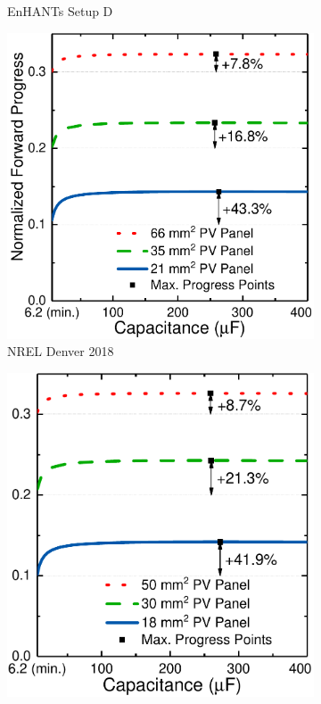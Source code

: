 \begin{figure}
\begin{subfigure}{0.483\columnwidth}
        \caption{EnHANTs Setup D}
        \label{fig:harvstor2}
    \end{subfigure}
    \hfil
    \begin{subfigure}{0.51\columnwidth}
        \centering
        \includegraphics[width=\columnwidth]{ch4_sizingapproach/figures/HarvStorTgFig3}
        \caption{NREL Denver 2018}
        \label{fig:harvstor3}
    \end{subfigure}
    \begin{subfigure}{0.483\columnwidth}
        \centering
        \includegraphics[width=\columnwidth]{ch4_sizingapproach/figures/HarvStorTgFig4}

\end{subfigure}
\end{figure}
